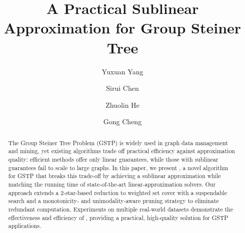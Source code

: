 \documentclass[sigconf, nonacm, pdfa]{acmart}
\begin{document}
% 

\title{A Practical Sublinear Approximation for Group Steiner Tree}

\author{Yuxuan Yang}

\author{Sirui Chen}

\author{Zhuolin He}

\author{Gong Cheng}

\begin{abstract}
The Group Steiner Tree Problem (GSTP) is widely used in graph data management and mining, yet existing algorithms trade off practical efficiency against approximation quality: efficient methods offer only linear guarantees, while those with sublinear guarantees fail to scale to large graphs. In this paper, we present \Improved, a novel algorithm for GSTP that breaks this trade‑off by achieving a sublinear approximation while matching the running time of state‑of‑the‑art linear‑approximation solvers. Our approach extends a 2‑star‑based reduction to weighted set cover with a suspendable search and a monotonicity‑ and unimodality‑aware pruning strategy to eliminate redundant computation. Experiments on multiple real‑world datasets demonstrate the effectiveness and efficiency of \Improved, providing a practical, high‑quality solution for GSTP applications.
\end{abstract}
\end{document}
